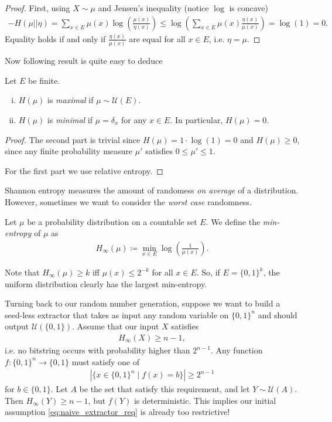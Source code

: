 \begin{proof}
    First, using $X \sim \mu$ and Jensen's inequality (notice $\log$ is concave)
    \begin{align*}
        -H(\mu || \eta)  = \sum_{x \in E}\mu(x)\log\left(\frac{\mu(x)}{\eta(x)}\right) \leq \log\left(\sum_{x \in E}\mu(x)\frac{\eta(x)}{\mu(x)}\right) = \log(1) = 0.
    \end{align*}
    Equality holds if and only if $\frac{\eta(x)}{\mu(x)}$ are equal for all $x \in E$,
    i.e. $\eta = \mu$.
\end{proof}
Now following result is quite easy to deduce
\begin{theorem}
    Let $E$ be finite.
    \begin{enumerate}[(i)]
        \item $H(\mu)$ is \emph{maximal} if $\mu \sim \mathcal U(E)$.
        \item $H(\mu)$ is \emph{minimal} if $\mu = \delta_x$ for any $x \in E$.
              In particular, $H(\mu) = 0$.
    \end{enumerate}
\end{theorem}
\begin{proof}
    The second part is trivial since $H(\mu) = 1 \cdot \log(1) = 0$ and $H(\mu) \geq 0$, since
    any finite probability measure $\mu'$ satisfies $0 \leq \mu' \leq 1$.

    For the first part we use relative entropy.
\end{proof}

Shannon entropy measures the amount of randomess \emph{on average} of a distribution.
However, sometimes we want to consider the \emph{worst case} randomness.
\begin{definition}
    Let $\mu$ be a probability distribution on a countable set $E$.
    We define the \emph{min-entropy} of $\mu$ as
    \begin{align*}
        H_\infty(\mu) \coloneqq \min_{x \in E}\log\left(\frac{1}{\mu(x)}\right).
    \end{align*}
\end{definition}
Note that $H_\infty(\mu) \geq k$ iff $\mu(x) \leq 2^{-k}$ for all $x\in E$.
So, if $E = \{0,1\}^k$, the uniform distribution clearly has the largest min-entropy.

Turning back to our random number generation,
suppose we want to build a seed-less extractor
that takes as input any random variable on $\{0,1\}^n$
and should output $\mathcal U(\{0,1\})$.
Assume that our input $X$ satisfies
\begin{align} \label{eq:naive_extractor_req}
    H_\infty(X) \geq n-1,
\end{align}
i.e. no bitstring occurs with probability higher than $2^{n-1}$.
Any function $f:\{0,1\}^n \rightarrow \{0,1\}$ must satisfy one of
\begin{align*}
    |\{x \in \{0,1\}^n \mid f(x)=b\}| \geq 2^{n-1}
\end{align*}
for $b \in \{0,1\}$.
Let $A$ be the set that satisfy this requirement, and let $Y \sim \mathcal U(A)$.
Then $H_\infty(Y) \geq n-1$, but $f(Y)$ is deterministic.
This implies our initial assumption \eqref{eq:naive_extractor_req} is already too restrictive!